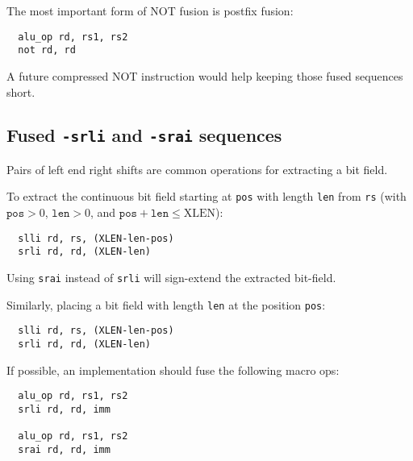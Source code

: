 The most important form of NOT fusion is postfix fusion:

\begin{minipage}{\linewidth}
\begin{verbatim}
  alu_op rd, rs1, rs2
  not rd, rd
\end{verbatim}
\end{minipage}

A future compressed NOT instruction would help keeping those fused sequences short.


\subsection{Fused {\tt *-srli} and {\tt *-srai} sequences}

Pairs of left end right shifts are common operations for extracting a bit field.

To extract the continuous bit field starting at {\tt pos} with length {\tt len}
from {\tt rs} (with $\texttt{pos}>0$, $\texttt{len}>0$, and
$\texttt{pos}+\texttt{len}\le\textrm{XLEN}$):

\begin{minipage}{\linewidth}
\begin{verbatim}
  slli rd, rs, (XLEN-len-pos)
  srli rd, rd, (XLEN-len)
\end{verbatim}
\end{minipage}

Using \texttt{srai} instead of \texttt{srli} will sign-extend the extracted bit-field.

Similarly, placing a bit field with length {\tt len} at the position {\tt pos}:

\begin{minipage}{\linewidth}
\begin{verbatim}
  slli rd, rs, (XLEN-len-pos)
  srli rd, rd, (XLEN-len)
\end{verbatim}
\end{minipage}

If possible, an implementation should fuse the following macro ops:

\begin{minipage}{\linewidth}
\begin{verbatim}
  alu_op rd, rs1, rs2
  srli rd, rd, imm

  alu_op rd, rs1, rs2
  srai rd, rd, imm
\end{verbatim}
\end{minipage}


